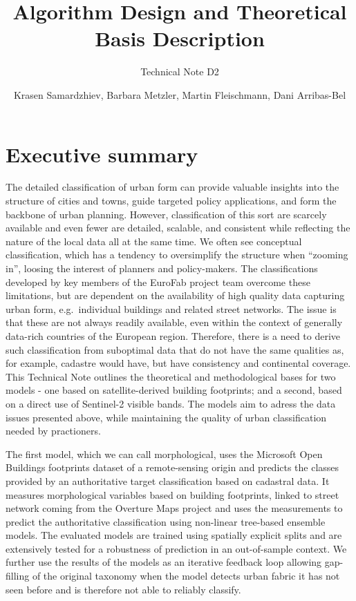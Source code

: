\documentclass[
  letterpaper,
  DIV=11,
  numbers=noendperiod]{scrartcl}
\title{Algorithm Design and Theoretical Basis Description}
\subtitle{Technical Note D2}
\author{Krasen Samardzhiev, Barbara Metzler, Martin Fleischmann, Dani
Arribas-Bel}
\date{}
\renewcommand*\contentsname{Table of contents}
\newcommand\contentsname{Table of contents}
\begin{document}
\maketitle

\renewcommand*\contentsname{Table of contents}
{
\hypersetup{linkcolor=}
\setcounter{tocdepth}{3}
\tableofcontents
}

\section{Executive summary}\label{executive-summary}

The detailed classification of urban form can provide valuable insights
into the structure of cities and towns, guide targeted policy
applications, and form the backbone of urban planning. However,
classification of this sort are scarcely available and even fewer are
detailed, scalable, and consistent while reflecting the nature of the
local data all at the same time. We often see conceptual classification,
which has a tendency to oversimplify the structure when ``zooming in'',
loosing the interest of planners and policy-makers. The classifications
developed by key members of the EuroFab project team overcome these
limitations, but are dependent on the availability of high quality data
capturing urban form, e.g.~individual buildings and related street
networks. The issue is that these are not always readily available, even
within the context of generally data-rich countries of the European
region. Therefore, there is a need to derive such classification from
suboptimal data that do not have the same qualities as, for example,
cadastre would have, but have consistency and continental coverage. This
Technical Note outlines the theoretical and methodological bases for two
models - one based on satellite-derived building footprints; and a
second, based on a direct use of Sentinel-2 visible bands. The models
aim to adress the data issues presented above, while maintaining the
quality of urban classification needed by practioners.

The first model, which we can call morphological, uses the Microsoft
Open Buildings footprints dataset of a remote-sensing origin and
predicts the classes provided by an authoritative target classification
based on cadastral data. It measures morphological variables based on
building footprints, linked to street network coming from the Overture
Maps project and uses the measurements to predict the authoritative
classification using non-linear tree-based ensemble models. The
evaluated models are trained using spatially explicit splits and are
extensively tested for a robustness of prediction in an out-of-sample
context. We further use the results of the models as an iterative
feedback loop allowing gap-filling of the original taxonomy when the
model detects urban fabric it has not seen before and is therefore not
able to reliably classify.
\end{document}
